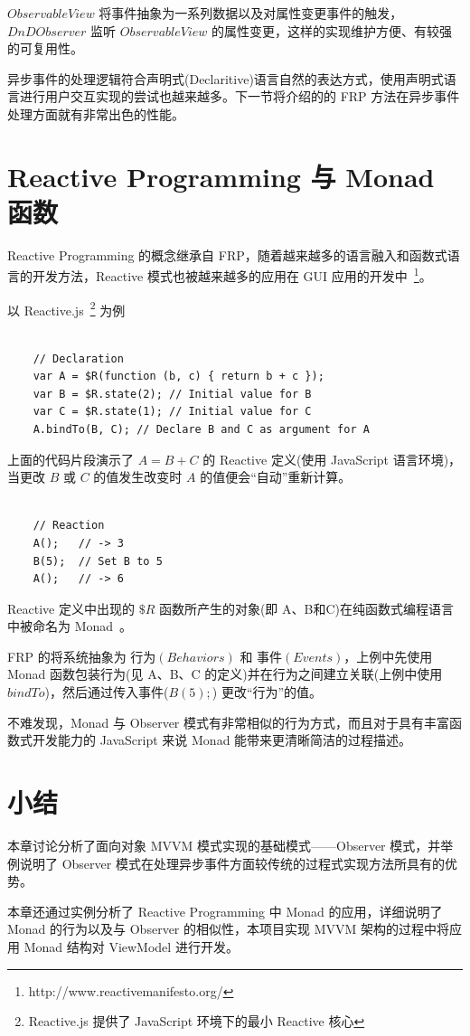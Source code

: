 $ObservableView$ 将事件抽象为一系列数据以及对属性变更事件的触发，$DnDObserver$ 监听 $ObservableView$ 的属性变更，这样的实现维护方便、有较强的可复用性。

异步事件的处理逻辑符合声明式(Declaritive)语言自然的表达方式，使用声明式语言进行用户交互实现的尝试也越来越多。下一节将介绍的的 FRP 方法在异步事件处理方面就有非常出色的性能。

\section{Reactive Programming 与 Monad 函数}

Reactive Programming 的概念继承自 FRP，随着越来越多的语言融入和函数式语言的开发方法，Reactive 模式也被越来越多的应用在 GUI 应用的开发中~\footnote{http://www.reactivemanifesto.org/}。

以 Reactive.js~\footnote{Reactive.js 提供了 JavaScript 环境下的最小 Reactive 核心} 为例~\cite{Carkci2013}

\begin{verbatim}

    // Declaration
    var A = $R(function (b, c) { return b + c });
    var B = $R.state(2); // Initial value for B
    var C = $R.state(1); // Initial value for C
    A.bindTo(B, C); // Declare B and C as argument for A

\end{verbatim}

上面的代码片段演示了 $A = B + C$ 的 Reactive 定义(使用 JavaScript 语言环境)，当更改 $B$ 或 $C$ 的值发生改变时 $A$ 的值便会“自动”重新计算。

\begin{verbatim}

    // Reaction
    A();   // -> 3
    B(5);  // Set B to 5
    A();   // -> 6

\end{verbatim}

Reactive 定义中出现的 $\$R$ 函数所产生的对象(即 A、B和C)在纯函数式编程语言中被命名为 Monad~\cite{raey}。

FRP 的将系统抽象为 $行为(Behaviors)$ 和 $事件(Events)$，上例中先使用 Monad 函数包装行为(见 A、B、C 的定义)并在行为之间建立关联(上例中使用 $bindTo$)，然后通过传入事件($B(5);$) 更改“行为”的值。

不难发现，Monad 与 Observer 模式有非常相似的行为方式，而且对于具有丰富函数式开发能力的 JavaScript 来说 Monad 能带来更清晰简洁的过程描述。

\section{小结}

本章讨论分析了面向对象 MVVM 模式实现的基础模式——Observer 模式，并举例说明了 Observer 模式在处理异步事件方面较传统的过程式实现方法所具有的优势。

本章还通过实例分析了 Reactive Programming 中 Monad 的应用，详细说明了 Monad 的行为以及与 Observer 的相似性，本项目实现 MVVM 架构的过程中将应用 Monad 结构对 ViewModel 进行开发。

